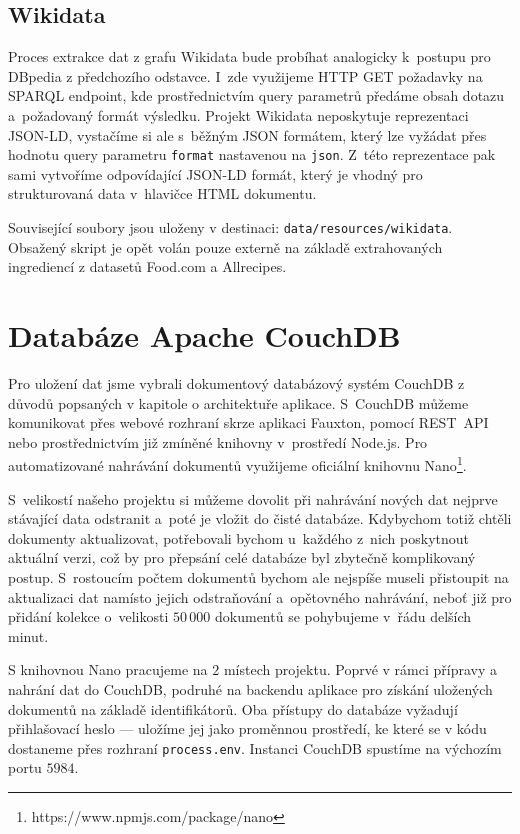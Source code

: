 \subsection{Wikidata}

Proces extrakce dat z grafu Wikidata bude probíhat analogicky k~postupu pro DBpedia z předchozího odstavce. I~zde využijeme HTTP GET požadavky na SPARQL endpoint, kde prostřednictvím query parametrů předáme obsah dotazu a~požadovaný formát výsledku. Projekt Wikidata neposkytuje reprezentaci JSON-LD, vystačíme si ale s~běžným JSON formátem, který lze vyžádat přes hodnotu query parametru \texttt{format} nastavenou na \texttt{json}. Z~této reprezentace pak sami vytvoříme odpovídající JSON-LD formát, který je vhodný pro strukturovaná data v~hlavičce HTML dokumentu.

Související soubory jsou uloženy v destinaci: \texttt{data/resources/wikidata}. Obsažený skript je opět volán pouze externě na základě extrahovaných ingrediencí z datasetů Food.com a Allrecipes. 

\section{Databáze Apache CouchDB}

Pro uložení dat jsme vybrali dokumentový databázový systém CouchDB z důvodů popsaných v kapitole o architektuře aplikace.  S~CouchDB můžeme komunikovat přes webové rozhraní skrze aplikaci Fauxton, pomocí REST~API nebo prostřednictvím již zmíněné knihovny v~prostředí Node.js. Pro automatizované nahrávání dokumentů využijeme oficiální knihovnu Nano\footnote{https://www.npmjs.com/package/nano}.

S~velikostí našeho projektu si můžeme dovolit při nahrávání nových dat nejprve stávající data odstranit a~poté je vložit do čisté databáze. Kdybychom totiž chtěli dokumenty aktualizovat, potřebovali bychom u~každého z~nich poskytnout aktuální verzi, což by pro přepsání celé databáze byl zbytečně komplikovaný postup. S~rostoucím počtem dokumentů bychom ale nejspíše museli přistoupit na aktualizaci dat namísto jejich odstraňování a~opětovného nahrávání, neboť již pro přidání kolekce o~velikosti $50\,000$ dokumentů se pohybujeme v~řádu delších minut.

S knihovnou Nano pracujeme na $2$ místech projektu. Poprvé v rámci přípravy a nahrání dat do CouchDB, podruhé na backendu aplikace pro získání uložených dokumentů na základě identifikátorů. Oba přístupy do databáze vyžadují přihlašovací heslo --- uložíme jej jako proměnnou prostředí, ke které se v kódu dostaneme přes rozhraní \texttt{process.env}. Instanci CouchDB spustíme na výchozím portu $5984$.

